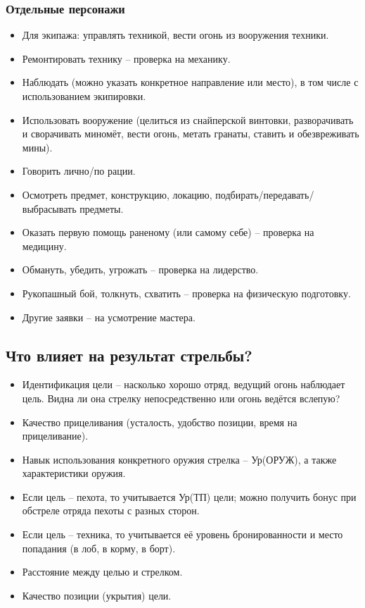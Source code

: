\documentclass[
]{article}
\begin{document}
\subsubsection*{Отдельные
персонажи}\label{ux43eux442ux434ux435ux43bux44cux43dux44bux435-ux43fux435ux440ux441ux43eux43dux430ux436ux438}

\begin{itemize}
\item
  Для экипажа: управлять техникой, вести огонь из вооружения техники.
\item
  Ремонтировать технику -- проверка на механику.
\item
  Наблюдать (можно указать конкретное направление или место), в том
  числе с использованием экипировки.
\item
  Использовать вооружение (целиться из снайперской винтовки,
  разворачивать и сворачивать миномёт, вести огонь, метать гранаты,
  ставить и обезвреживать мины).
\item
  Говорить лично/по рации.
\item
  Осмотреть предмет, конструкцию, локацию,
  подбирать/передавать/выбрасывать предметы.
\item
  Оказать первую помощь раненому (или самому себе) -- проверка на
  медицину.
\item
  Обмануть, убедить, угрожать -- проверка на лидерство.
\item
  Рукопашный бой, толкнуть, схватить -- проверка на физическую
  подготовку.
\item
  Другие заявки -- на усмотрение мастера.
\end{itemize}

\subsection*{Что влияет на результат
стрельбы?}\label{ux447ux442ux43e-ux432ux43bux438ux44fux435ux442-ux43dux430-ux440ux435ux437ux443ux43bux44cux442ux430ux442-ux441ux442ux440ux435ux43bux44cux431ux44b}

\begin{itemize}
\item
  Идентификация цели -- насколько хорошо отряд, ведущий огонь наблюдает
  цель. Видна ли она стрелку непосредственно или огонь ведётся вслепую?
\item
  Качество прицеливания (усталость, удобство позиции, время на
  прицеливание).
\item
  Навык использования конкретного оружия стрелка -- Ур(ОРУЖ), а также
  характеристики оружия.
\item
  Если цель -- пехота, то учитывается Ур(ТП) цели; можно получить бонус
  при обстреле отряда пехоты с разных сторон.
\item
  Если цель -- техника, то учитывается её уровень бронированности и
  место попадания (в лоб, в корму, в борт).
\item
  Расстояние между целью и стрелком.
\item
  Качество позиции (укрытия) цели.
\end{itemize}
\end{document}
